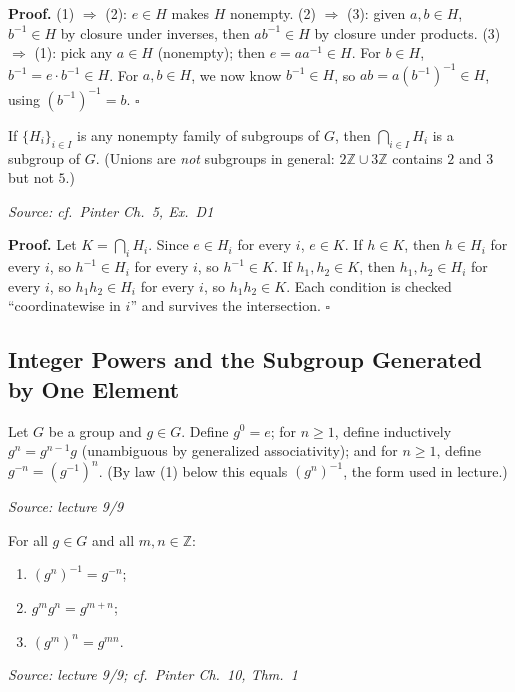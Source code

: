 \documentclass[11pt]{report}
\renewenvironment{proof}[1][Proof]{\noindent\textbf{#1.} }{\hfill$\square$\par\vspace{5pt}}
\newcommand{\srcline}[1]{\par\hfill{\footnotesize\textit{Source: #1}}}
\begin{document}
\begin{proof}
(1) $\Rightarrow$ (2): $e \in H$ makes $H$ nonempty. (2) $\Rightarrow$ (3): given $a, b \in H$, $b^{-1} \in H$ by closure under inverses, then $ab^{-1} \in H$ by closure under products. (3) $\Rightarrow$ (1): pick any $a \in H$ (nonempty); then $e = a a^{-1} \in H$. For $b \in H$, $b^{-1} = e \cdot b^{-1} \in H$. For $a, b \in H$, we now know $b^{-1} \in H$, so $ab = a (b^{-1})^{-1} \in H$, using $(b^{-1})^{-1} = b$.
\end{proof}

\begin{propbox}\label{prop:intersections-subgroups}
If $\{H_i\}_{i \in I}$ is any nonempty family of subgroups of $G$, then $\bigcap_{i \in I} H_i$ is a subgroup of $G$. (Unions are \emph{not} subgroups in general: $2\mathbb{Z} \cup 3\mathbb{Z}$ contains $2$ and $3$ but not $5$.)
\srcline{cf.\ Pinter Ch.\ 5, Ex.\ D1}
\end{propbox}

\begin{proof}
Let $K = \bigcap_i H_i$. Since $e \in H_i$ for every $i$, $e \in K$. If $h \in K$, then $h \in H_i$ for every $i$, so $h^{-1} \in H_i$ for every $i$, so $h^{-1} \in K$. If $h_1, h_2 \in K$, then $h_1, h_2 \in H_i$ for every $i$, so $h_1 h_2 \in H_i$ for every $i$, so $h_1 h_2 \in K$. Each condition is checked ``coordinatewise in $i$'' and survives the intersection.
\end{proof}

\subsection{Integer Powers and the Subgroup Generated by One Element}

\begin{defbox}\label{def:integer-powers}
Let $G$ be a group and $g \in G$. Define $g^0 = e$; for $n \geq 1$, define inductively $g^n = g^{n-1} g$ (unambiguous by generalized associativity); and for $n \geq 1$, define $g^{-n} = (g^{-1})^n$. (By law (1) below this equals $(g^n)^{-1}$, the form used in lecture.)
\srcline{lecture 9/9}
\end{defbox}

\begin{lembox}\label{lem:exponent-laws}
For all $g \in G$ and all $m, n \in \mathbb{Z}$:
\begin{enumerate}
    \item $(g^n)^{-1} = g^{-n}$;
    \item $g^m g^n = g^{m+n}$;
    \item $(g^m)^n = g^{mn}$.
\end{enumerate}
\srcline{lecture 9/9; cf.\ Pinter Ch.\ 10, Thm.\ 1}
\end{lembox}
\end{document}
